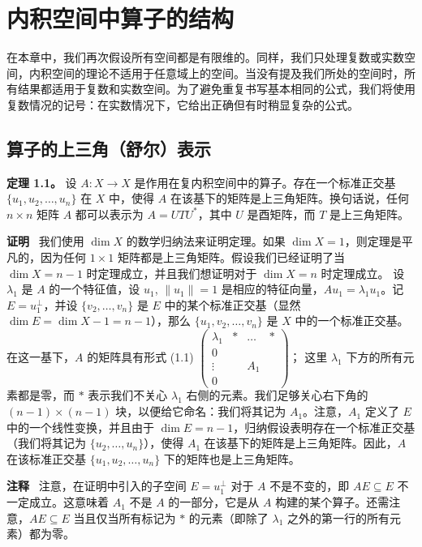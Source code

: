 \chapter{内积空间中算子的结构}

在本章中，我们再次假设所有空间都是有限维的。同样，我们只处理复数或实数空间，内积空间的理论不适用于任意域上的空间。当没有提及我们所处的空间时，所有结果都适用于复数和实数空间。为了避免重复书写基本相同的公式，我们将使用复数情况的记号：在实数情况下，它给出正确但有时稍显复杂的公式。

\section{算子的上三角（舒尔）表示}

\textbf{定理 1.1。} 设 $A: X \to X$ 是作用在复内积空间中的算子。存在一个标准正交基 $\{u_1, u_2, \dots, u_n\}$ 在 $X$ 中，使得 $A$ 在该基下的矩阵是上三角矩阵。换句话说，任何 $n \times n$ 矩阵 $A$ 都可以表示为 $A = UTU^*$，其中 $U$ 是酉矩阵，而 $T$ 是上三角矩阵。

\textbf{证明}~ 我们使用 $\dim X$ 的数学归纳法来证明定理。如果 $\dim X = 1$，则定理是平凡的，因为任何 $1 \times 1$ 矩阵都是上三角矩阵。假设我们已经证明了当 $\dim X = n-1$ 时定理成立，并且我们想证明对于 $\dim X = n$ 时定理成立。
设 $\lambda_1$ 是 $A$ 的一个特征值，设 $u_1$, $\|u_1\| = 1$ 是相应的特征向量，$Au_1 = \lambda_1 u_1$。记 $E = u_1^\perp$，并设 $\{v_2, \dots, v_n\}$ 是 $E$ 中的某个标准正交基（显然 $\dim E = \dim X - 1 = n-1$），那么 $\{u_1, v_2, \dots, v_n\}$ 是 $X$ 中的一个标准正交基。在这一基下，$A$ 的矩阵具有形式 (1.1)
$\begin{pmatrix} \lambda_1 & * & \dots & * \\ 0 & & & \\ \vdots & & A_1 & \\ 0 & & & \end{pmatrix}$；
这里 $\lambda_1$ 下方的所有元素都是零，而 $*$ 表示我们不关心 $\lambda_1$ 右侧的元素。我们足够关心右下角的 $(n-1) \times (n-1)$ 块，以便给它命名：我们将其记为 $A_1$。注意，$A_1$ 定义了 $E$ 中的一个线性变换，并且由于 $\dim E = n-1$，归纳假设表明存在一个标准正交基（我们将其记为 $\{u_2, \dots, u_n\}$），使得 $A_1$ 在该基下的矩阵是上三角矩阵。因此，$A$ 在该标准正交基 $\{u_1, u_2, \dots, u_n\}$ 下的矩阵也是上三角矩阵。

\textbf{注释} ~注意，在证明中引入的子空间 $E = u_1^\perp$ 对于 $A$ 不是不变的，即 $AE \subseteq E$ 不一定成立。这意味着 $A_1$ 不是 $A$ 的一部分，它是从 $A$ 构建的某个算子。还需注意，$AE \subseteq E$ 当且仅当所有标记为 $*$ 的元素（即除了 $\lambda_1$ 之外的第一行的所有元素）都为零。

